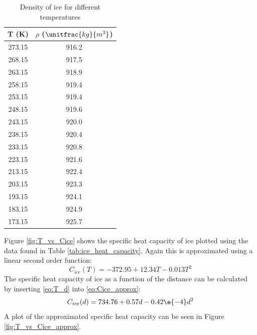 \begin{table}
	\centering
	\begin{tabular}{|c|c|}
		\hline
		T (K) & $\rho$ ($\unitfrac{kg}{m^3}$) \\ \hline
		273.15 & 916.2 \\ \hline
		268.15 & 917.5 \\ \hline
		263.15 & 918.9 \\ \hline
		258.15 & 919.4 \\ \hline
		253.15 & 919.4 \\ \hline
		248.15 & 919.6 \\ \hline
		243.15 & 920.0 \\ \hline
		238.15 & 920.4 \\ \hline
		233.15 & 920.8 \\ \hline
		223.15 & 921.6 \\ \hline
		213.15 & 922.4 \\ \hline
		203.15 & 923.3 \\ \hline
		193.15 & 924.1 \\ \hline
		183.15 & 924.9 \\ \hline
		173.15 & 925.7 \\ \hline
	\end{tabular}
	\caption{Density of ice for different temperatures\cite{website:iceDensity}}
	\label{tab:ice_density}
\end{table}
\noindent
Figure \ref{fig:T_vs_Cice} shows the specific heat capacity of ice plotted using the data found in Table \ref{tab:ice_heat_capacity}. Again this is approximated using a linear second order function:
\begin{equation}\label{eq:Cice_approx}
	C_{ice}(T) = -372.95 + 12.34 T - 0.013 T^2
\end{equation}
The specific heat capacity of ice as a function of the distance can be calculated by inserting \eqref{eq:T_d} into \eqref{eq:Cice_approx}:
\begin{equation}\label{eq:Cice_approx_d}
	C_{ice}(d) = 734.76 + 0.57 d - 0.42 \e{-4} d^2
\end{equation}
A plot of the approximated specific heat capacity can be seen in Figure \ref{fig:T_vs_Cice_approx}.

